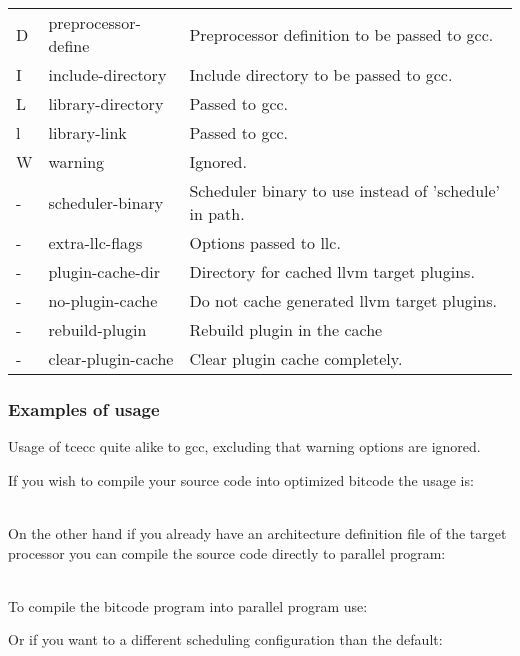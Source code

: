 \documentclass[twoside]{tceusermanual}
\begin{document}
\begin{longtable}[htb]{@{}p{}@{}p{}%
                     @{}p{}}
D & preprocessor-define & Preprocessor definition to be passed to gcc. \\
I & include-directory & Include directory to be passed to gcc. \\
L & library-directory & Passed to gcc. \\
l & library-link & Passed to gcc. \\
W & warning & Ignored. \\
- & scheduler-binary & Scheduler binary to use instead of 'schedule' in path. \\
- & extra-llc-flags & Options passed to llc. \\
- & plugin-cache-dir & Directory for cached llvm target plugins. \\
- & no-plugin-cache & Do not cache generated llvm target plugins. \\
- & rebuild-plugin & Rebuild plugin in the cache \\
- & clear-plugin-cache & Clear plugin cache completely. \\
\end{longtable}


\subsubsection{Examples of usage}

Usage of tcecc quite alike to gcc, excluding that warning options are
ignored.

If you wish to compile your source code into optimized bitcode the
usage is:

 \\

On the other hand if you already have an architecture definition file of the
target processor you can compile the source code directly to parallel program:

 \\

To compile the bitcode program into parallel program use:


Or if you want to a different scheduling configuration than the default:

 \\
\end{document}
